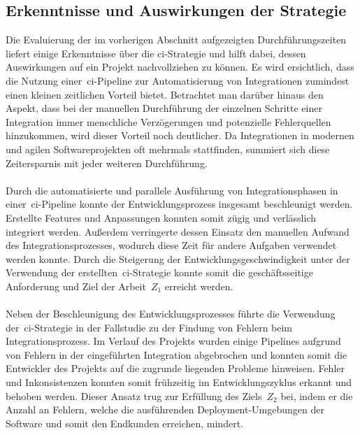 \subsection{Erkenntnisse und Auswirkungen der Strategie} \label{subsec:05-evaluation-2}

Die Evaluierung der im vorherigen Abschnitt aufgezeigten Durchführungszeiten liefert einige Erkenntnisse über die
\acrshort{ci}-Strategie und hilft dabei, dessen Auswirkungen auf ein Projekt nachvollziehen zu können.
Es wird ersichtlich, dass die Nutzung einer\ \acrshort{ci}-Pipeline zur Automatisierung von Integrationen zumindest
einen kleinen zeitlichen Vorteil bietet.
Betrachtet man darüber hinaus den Aspekt, dass bei der manuellen Durchführung der einzelnen Schritte einer Integration
immer menschliche Verzögerungen und potenzielle Fehlerquellen hinzukommen, wird dieser Vorteil noch deutlicher.
Da Integrationen in modernen und agilen Softwareprojekten oft mehrmals stattfinden, summiert sich diese Zeitersparnis
mit jeder weiteren Durchführung.
\\\\
Durch die automatisierte und parallele Ausführung von Integrationsphasen in einer\ \acrshort{ci}-Pipeline konnte der
Entwicklungsprozess insgesamt beschleunigt werden.
Erstellte Features und Anpassungen konnten somit zügig und verlässlich integriert werden.
Außerdem verringerte dessen Einsatz den manuellen Aufwand des Integrationsprozesses, wodurch diese Zeit für andere
Aufgaben verwendet werden konnte.
Durch die Steigerung der Entwicklungsgeschwindigkeit unter der Verwendung der erstellten\ \acrshort{ci}-Strategie
konnte somit die geschäftsseitige Anforderung und Ziel der Arbeit\ \hyperlink{project-goals}{$Z_1$} erreicht werden.
\\\\
Neben der Beschleunigung des Entwicklungsprozesses führte die Verwendung der\ \acrshort{ci}-Strategie in der Fallstudie
zu der Findung von Fehlern beim Integrationsprozess.
Im Verlauf des Projekts wurden einige Pipelines aufgrund von Fehlern in der eingeführten Integration abgebrochen und
konnten somit die Entwickler des Projekts auf die zugrunde liegenden Probleme hinweisen.
Fehler und Inkonsistenzen konnten somit frühzeitig im Entwicklungszyklus erkannt und behoben werden.
Dieser Ansatz trug zur Erfüllung des Ziels\ \hyperlink{project-goals}{$Z_2$} bei, indem er die Anzahl an Fehlern, welche
die ausführenden Deployment-Umgebungen der Software und somit den Endkunden erreichen, mindert.
\\\\
